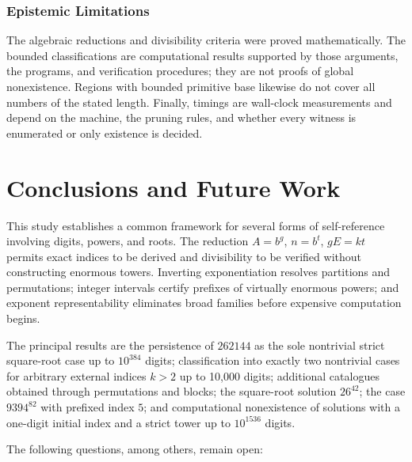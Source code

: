 \documentclass[11pt,a4paper]{article}
\begin{document}
\subsubsection{Epistemic Limitations}

The algebraic reductions and divisibility criteria were proved mathematically. The bounded classifications are computational results supported by those arguments, the programs, and verification procedures; they are not proofs of global nonexistence. Regions with bounded primitive base likewise do not cover all numbers of the stated length. Finally, timings are wall-clock measurements and depend on the machine, the pruning rules, and whether every witness is enumerated or only existence is decided.

\section{Conclusions and Future Work}

This study establishes a common framework for several forms of self-reference involving digits, powers, and roots. The reduction $A=b^g$, $n=b^t$, $gE=kt$ permits exact indices to be derived and divisibility to be verified without constructing enormous towers. Inverting exponentiation resolves partitions and permutations; integer intervals certify prefixes of virtually enormous powers; and exponent representability eliminates broad families before expensive computation begins.

The principal results are the persistence of $262144$ as the sole nontrivial strict square-root case up to $10^{384}$ digits; classification into exactly two nontrivial cases for arbitrary external indices $k>2$ up to 10,000 digits; additional catalogues obtained through permutations and blocks; the square-root solution $26^{42}$; the case $9394^{82}$ with prefixed index $5$; and computational nonexistence of solutions with a one-digit initial index and a strict tower up to $10^{1536}$ digits.

The following questions, among others, remain open:
\end{document}

